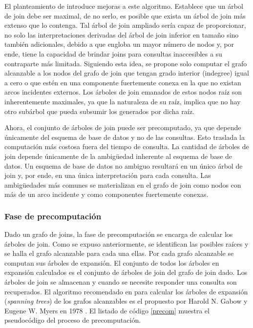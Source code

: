 El planteamiento de \cite{mason2005autojoin} introduce mejoras a este algoritmo. Establece que un \'arbol 
de join debe ser maximal, de no serlo, es posible que exista un \'arbol de join m\'as extenso que lo contenga. 
Tal \'arbol de join ampliado sería capaz de proporcionar, no solo 
las interpretaciones derivadas del \'arbol de join inferior en tamaño sino también adicionales, debido a que engloba 
un mayor número de nodos y, por ende, tiene la capacidad de brindar joins para consultas inaccesibles a su 
contraparte más limitada. Siguiendo esta idea, se propone solo computar el grafo alcanzable 
a los nodos del grafo de join que tengan grado interior (indegree) igual a cero o que est\'en en una 
componente fuertemente conexa en la que no existan arcos incidentes externos. 
Los \'arboles de join emanados de estos nodos raíz son inherentemente maximales, ya que la naturaleza de su raíz, 
implica que no hay otro subárbol que pueda subsumir los generados por dicha raíz.

Ahora, el conjunto de árboles de join puede ser precomputado, ya que depende únicamente del esquema de base de 
datos y no de las consultas. Esto traslada la computación más costosa fuera del tiempo de consulta. La cantidad
de \'arboles de join depende \'unicamente de la ambigüedad inherente al esquema de base de datos. Un esquema 
de base de datos no ambiguo resultar\'a en un único \'arbol de join y, por ende, en una \'unica interpretación 
para cada consulta. Las ambigüedades m\'as comunes se materializan en el grafo de join como nodos con m\'as de 
un arco incidente y como componentes fuertemente conexas.

\subsubsection{Fase de precomputaci\'on}

Dado un grafo de joins, la fase de precomputaci\'on se encarga de calcular los \'arboles de join. Como se expuso 
anteriormente, se identifican las posibles raíces y se halla el grafo alcanzable para cada una ellas. 
Por cada grafo alcanzable se computan sus \'arboles de expansión. El conjunto de todos los \'arboles en 
expansión calculados es el conjunto de \'arboles de join del grafo de join dado. Los \'arboles de join 
se almacenan y cuando se necesite responder una consulta son recuperados. El algoritmo recomendado en \cite{mason2005autojoin} 
para calcular 
los \'arboles de expansión (\emph{spanning trees}) de los grafos alcanzables es el propuesto por Harold N. Gabow y 
Eugene W. Myers en 1978 \cite{gabow1978finding}. El listado de código \ref{precom} muestra el pseudoc\'odigo 
del proceso de precomputaci\'on.

